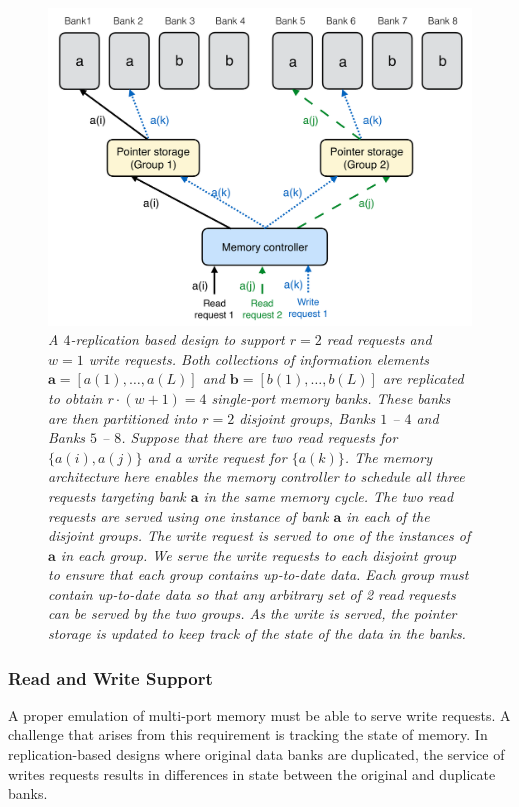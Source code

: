 \begin{figure}[t!]
\centering
\includegraphics[width=0.86\linewidth]{fig/rw-replication.pdf}
\caption{\it{A $4$-replication based design to support $r = 2$ read requests and $w = 1$ write requests. Both collections of information elements $\mathbf{a} = [a(1),\ldots, a(L)]$ and $\mathbf{b} = [b(1),\ldots, b(L)]$ are replicated to obtain $r\cdot (w + 1) = 4$ single-port memory banks. These banks are then partitioned into $r = 2$ disjoint groups, Banks $1$ -- $4$ and Banks $5$ -- $8$. 
Suppose that there are two read requests for $\{a(i), a(j)\}$ and a write request for $\{a(k)\}$. The memory architecture here enables the memory controller to schedule all three requests targeting bank $\mathbf{a}$ in the same memory cycle. The two read requests are served using one instance of bank $\mathbf{a}$ in each of the disjoint groups. The write request is served to one of the instances of $\mathbf{a}$ in each group. We serve the write requests to each disjoint group to ensure that each group contains up-to-date data. Each group must contain up-to-date data so that any arbitrary set of 2 read requests can be served by the two groups. As the write is served, the pointer storage is updated to keep track of the state of the data in the banks.}}
\label{fig:rw_replication}
\end{figure}
\subsubsection{Read and Write Support}
\label{sec:rw}
A proper emulation of multi-port memory must be able to serve  write requests. A challenge that arises from this requirement is tracking the state of memory. In replication-based designs where original data banks are duplicated, the service of writes requests results in differences in state between the original and duplicate banks.

